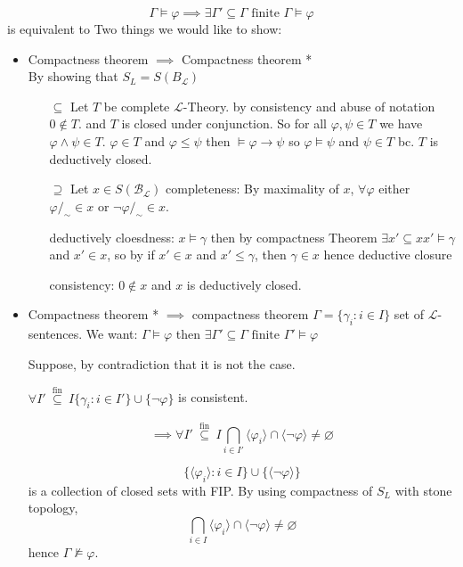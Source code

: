 \[\Gamma \models \varphi \implies \exists \Gamma'\subseteq \Gamma \text{ finite } \Gamma\models \varphi\]
is equivalent to 
Two things we would like to show:
\begin{itemize}
    \item Compactness theorem $\implies$ Compactness theorem *\\
    By showing that $S_L=S(B_\mathcal{L})$
    \begin{claimproof}
        \begin{itemize}
            \item[$\subseteq$] Let $T$ be complete $\mathcal{L}$-Theory. by consistency and abuse of notation $0\notin T$. and $T$ is closed under conjunction.
            So for all $\varphi,\psi\in T$ we have $\varphi\land\psi\in T$.
            $\varphi\in T$ and $\varphi\leq \psi$ then $\models \varphi\to \psi$ so $\varphi\models \psi$ and $\psi\in T$ bc. $T$ is deductively closed.
            \item[$\supseteq$] Let $x\in S(\mathcal{B}_\mathcal{L})$ 
            completeness: By maximality of $x$, $\forall \varphi$ either $\varphi/_\sim \in x$ or $\lnot \varphi/_\sim\in x$.

            deductively cloesdness: $x\models \gamma$ then by compactness Theorem $\exists x'\subseteq x x'\models \gamma$ and $x'\in x$, so by if $x'\in x$ and $x'\leq \gamma$, then $\gamma\in x$ hence deductive closure

            consistency: $0\notin x$ and $x$ is deductively closed.
        \end{itemize}
    \end{claimproof}
    \item Compactness theorem * $\implies$ compactness theorem
    $\Gamma = \{\gamma_i : i\in I\}$ set of $\mathcal{L}$-sentences.
    We want: $\Gamma\models \varphi$ then $\exists \Gamma'\subseteq \Gamma \text{ finite } \Gamma'\models \varphi$

    \begin{claimproof}
        Suppose, by contradiction that it is not the case.

        $\forall I'\stackrel{\text{ fin }}{\subseteq} I \{\gamma_i : i\in I'\}\cup \{\lnot \varphi\}$ is consistent.

        \[\implies \forall I'\stackrel{\text{ fin }}{\subseteq} I \bigcap_{i\in I'} \langle\varphi_i\rangle\cap \langle\lnot \varphi\rangle \neq \varnothing\]

        \[\{\langle\varphi_i\rangle : i\in I\}\cup \{ \langle\lnot \varphi\rangle \}\]
        is a collection of closed sets with FIP.
        By using compactness of $S_L$ with stone topology,
        \[\bigcap_{i\in I} \langle\varphi_i\rangle\cap \langle\lnot \varphi\rangle \neq \varnothing\]
        hence $\Gamma \not\models \varphi$.
    \end{claimproof}

\end{itemize}

























